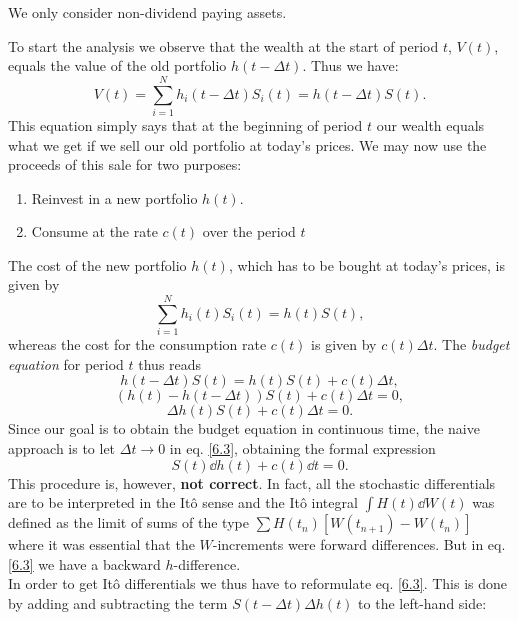 \begin{remark}
    We only consider non-dividend paying assets.
\end{remark}
To start the analysis we observe that the wealth at the
start of period $t$, $V(t)$, equals the value of the old portfolio $h(t - \Delta t)$. Thus we have:
\begin{equation}\label{6.1}
    V(t) = \sum^N_{i=1}h_i(t-\Delta t)S_i(t) = h(t-\Delta t)S(t).
\end{equation}
This equation simply says that at the beginning of period $t$ our wealth equals what we get if we sell our old portfolio at today's
prices. We may now use the proceeds of this sale for two purposes:
\begin{enumerate}
    \item Reinvest in a new portfolio $h(t)$.
    \item Consume at the rate $c(t)$ over the period $t$
\end{enumerate}
The cost of the new portfolio $h(t)$, which has to be bought at today’s prices, is given by
\begin{equation}
    \sum^N_{i=1} h_i(t)S_i(t) = h(t)S(t),
\end{equation}
whereas the cost for the consumption rate $c(t)$ is given by $c(t)\Delta t$. The \emph{budget equation} for period $t$ thus reads
\begin{equation}
    h(t-\Delta t)S(t) = h(t)S(t) + c(t)\Delta t,
\end{equation}
\begin{equation*}
    (h(t)-h(t-\Delta t))S(t) + c(t)\Delta t = 0,
\end{equation*}
\begin{equation}\label{6.3}
    \Delta h(t)S(t) + c(t)\Delta t = 0.
\end{equation}
Since our goal is to obtain the budget equation in continuous time, the naive approach is to let $\Delta t \to 0$ in eq. \eqref{6.3}, obtaining the formal expression
\begin{equation}
    S(t)\dd h(t) + c(t)\dd t = 0.
\end{equation}
This procedure is, however, \textbf{not correct}. In fact, all the stochastic differentials are to be interpreted in the Itô sense and the Itô integral $\int H(t)\dd W(t)$ was defined as the limit of sums of the type $\sum H(t_n)[W(t_{n+1})-W(t_n)]$ where it was essential that the $W$-increments were forward differences. But in eq. \eqref{6.3} we have a backward $h$-difference.\\
In order to get Itô differentials we thus have to reformulate eq. \eqref{6.3}. This is done by adding and subtracting the term $S(t- \Delta t)\Delta h(t)$ to the left-hand side:
